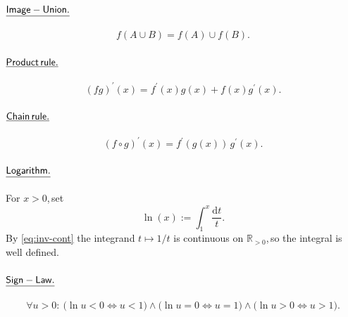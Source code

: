 \documentclass[11pt,reqno]{amsart}
\providecommand{\R}{\mathbb{R}}
\theoremstyle{redplain}
\begin{document}
\paragraph{$\mathsf{\protect\underline{Image-Union.}}$}

\text{\ } 
\begin{equation}  \label{eq:image-union}
f(A\cup B)=f(A)\cup f(B).
\end{equation}

\paragraph{$\mathsf{\protect\underline{Product\,rule.}}$}

\text{\ } 
\begin{equation}  \label{eq:product-rule}
(fg)^{\prime }(x)=f^{\prime }(x)g(x)+f(x)g^{\prime }(x).
\end{equation}

\paragraph{$\mathsf{\protect\underline{Chain\,rule.}}$}

\text{\ } 
\begin{equation}  \label{eq:chain-rule}
(f\circ g)^{\prime }(x)=f^{\prime }(g(x))\,g^{\prime }(x).
\end{equation}

\paragraph{$\mathsf{\protect\underline{Logarithm.}}$}

\text{\ } For $x>0$,\,\allowbreak set 
\begin{equation}  \label{eq:def-ln}
\ln(x):=\int_1^x \frac{\mathrm{d}t}{t}.
\end{equation}
By \autoref{eq:inv-cont} the integrand $t\mapsto 1/t$ is continuous on $\R%
_{>0}$,\,\allowbreak so the integral is well defined.

\paragraph{$\mathsf{\protect\underline{Sign-Law.}}$}

\text{\ } 
\begin{equation}  \label{eq:sign-law}
\forall u>0:\ \bigl(\ln u<0\iff u<1\bigr)\wedge\bigl(\ln u=0\iff u=1\bigr)%
\wedge\bigl(\ln u>0\iff u>1\bigr).
\end{equation}
\end{document}
